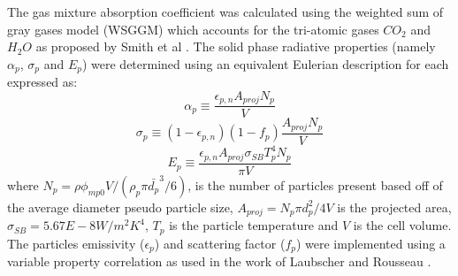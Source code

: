 \documentclass{webofc}
\begin{document}
The gas mixture absorption coefficient was calculated using the weighted sum of gray gases model (WSGGM) which accounts for the tri-atomic gases $CO_2$ and $H_2O$ as proposed by Smith et al \cite{smith}. The solid phase radiative properties (namely $\alpha_p$, $\sigma_p$ and $E_p$) were determined using an equivalent Eulerian description for each expressed as:\\
\begin{equation}
\alpha_p \equiv \frac{\epsilon_{p,n}A_{proj}N_p}{V}
\end{equation}
\begin{equation}
\sigma_p \equiv (1-\epsilon_{p,n})(1-f_p)\frac{A_{proj} N_p}{V}
\end{equation} 
\begin{equation}
E_p \equiv \frac{\epsilon_{p,n}A_{proj}\sigma_{SB} T_{p}^4 N_p}{\pi V}
\end{equation}
where $N_p = \rho \phi_{mp0} V / \left( \rho_p \pi \bar{d_p}^3 /6 \right)$, is the number of particles present based off of the average diameter pseudo particle size, $A_{proj} = N_p \pi d_p^2 / 4 V$ is the projected area, $\sigma_{SB} = 5.67E-8 W/m^2K^4$, $T_p$ is the particle temperature and $V$ is the cell volume. The particles emissivity ($\epsilon_p$) and scattering factor ($f_p$) were implemented using a variable property correlation as used in the work of Laubscher and Rousseau \cite{laubscher_3}.
\end{document}
